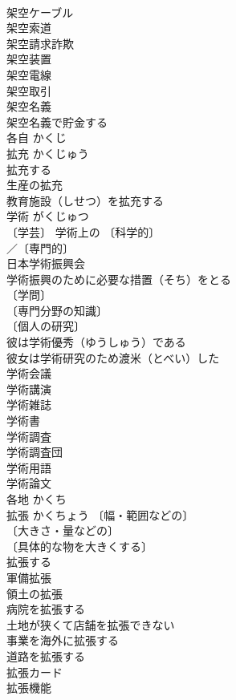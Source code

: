 \documentclass[8pt]{extreport}
\begin{document}
\begin{CJK}{UTF8}{min}
\\	架空ケーブル 
\\	架空索道 
\\	架空請求詐欺 
\\	架空装置 
\\	架空電線 
\\	架空取引 
\\	架空名義 
\\	架空名義で貯金する 
\\	各自	かくじ	
\\	拡充	かくじゅう	
\\	拡充する 
\\	生産の拡充 
\\	教育施設（しせつ）を拡充する 
\\	学術	がくじゅつ	
\\	〔学芸〕 学術上の 〔科学的〕
\\	／〔専門的〕
\\	日本学術振興会 
\\	学術振興のために必要な措置（そち）をとる 
\\	〔学問〕
\\	〔専門分野の知識〕
\\	〔個人の研究〕
\\	彼は学術優秀（ゆうしゅう）である 
\\	彼女は学術研究のため渡米（とべい）した 
\\	学術会議 
\\	学術講演 
\\	学術雑誌 
\\	学術書 
\\	学術調査 
\\	学術調査団 
\\	学術用語 
\\	学術論文 
\\	各地	かくち	
\\	拡張	かくちょう	〔幅・範囲などの〕
\\	〔大きさ・量などの〕
\\	〔具体的な物を大きくする〕
\\	拡張する 
\\	軍備拡張 
\\	領土の拡張 
\\	病院を拡張する 
\\	土地が狭くて店舗を拡張できない 
\\	事業を海外に拡張する 
\\	道路を拡張する 
\\	拡張カード 
\\	拡張機能 

\end{CJK}
\end{document}
